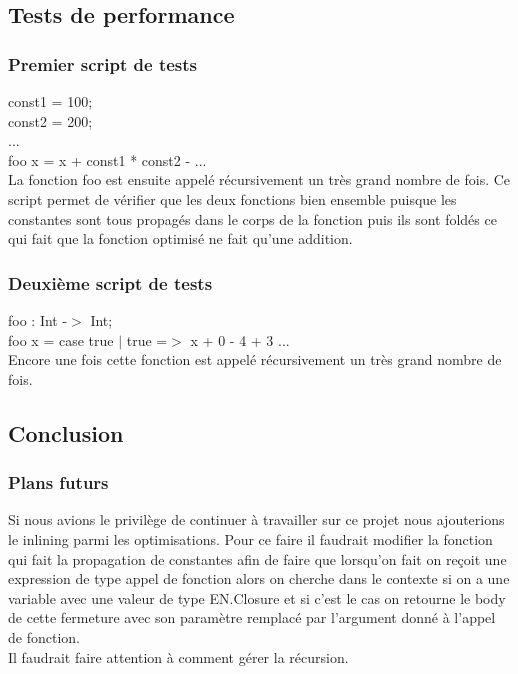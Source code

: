 \documentclass{beamer}
\begin{document}
\subsection{Tests de performance}
\begin{frame}
    \frametitle{Premier script de tests}
    const1 = 100;\\
    const2 = 200;\\
    ...\\
    \bigskip
    foo x = x + const1 * const2 - ...\\
    \bigskip
    La fonction foo est ensuite appelé récursivement un très grand nombre de fois. Ce script permet de vérifier que les
    deux fonctions bien ensemble puisque les constantes sont tous propagés dans le corps de la fonction puis ils sont
    foldés ce qui fait que la fonction optimisé ne fait qu'une addition.

\end{frame}

\begin{frame}
    \frametitle{Deuxième script de tests}
    foo : Int -$>$ Int;\\
    foo x = case true
        $|$ true =$>$ x + 0 - 4 + 3 ...\\
    \bigskip
    Encore une fois cette fonction est appelé récursivement un très grand
    nombre de fois.

\end{frame}

\subsection{Conclusion}

\begin{frame}
    \frametitle{Plans futurs}
    Si nous avions le privilège de continuer à travailler sur ce projet nous
    ajouterions le inlining parmi les optimisations. Pour ce faire il faudrait
    modifier la fonction qui fait la propagation de constantes afin de faire
    que lorsqu'on fait on reçoit une expression de type appel de fonction alors
    on cherche dans le contexte si on a une variable avec une valeur de type 
    EN.Closure et si c'est le cas on retourne le body de cette fermeture avec
    son paramètre remplacé par l'argument donné à l'appel de fonction.\\
    \bigskip
    Il faudrait faire attention à comment gérer la récursion.
\end{frame}
\end{document}
